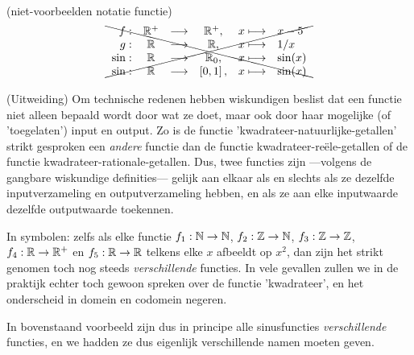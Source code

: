 \documentclass{ximera}
\begin{document}
\begin{example} (niet-voorbeelden notatie functie)
$$  
\xcancel{
	\begin{array}{rcccll}    
	f:   & \mathbb{R}^+        &\longrightarrow& \mathbb{R}^+,         &x  \longmapsto & x-5  \\
	g:   & \mathbb{R}      &\longrightarrow& \mathbb{R},         &x  \longmapsto & 1/x \\
	\sin:& \mathbb{R}        &\longrightarrow& \mathbb{R}_0,  &x \longmapsto & \sin(x) \\
	\sin:& \mathbb{R}        &\longrightarrow& \left[0,1\right],  &x \longmapsto & \sin(x) 
	\end{array}
}
	$$
\end{example}

\begin{uitweiding}
    
(Uitweiding) Om technische redenen hebben wiskundigen beslist dat een functie niet alleen bepaald wordt door wat ze doet, maar ook door haar mogelijke (of 'toegelaten') input en output. Zo is de functie 'kwadrateer-natuurlijke-getallen' strikt gesproken een \textit{andere} functie dan de functie kwadrateer-reële-getallen of de functie kwadrateer-rationale-getallen. Dus, twee functies zijn ---volgens de gangbare wiskundige definities--- gelijk aan elkaar als en slechts als ze dezelfde inputverzameling en outputverzameling hebben, en als ze aan elke inputwaarde dezelfde outputwaarde toekennen.

In symbolen: zelfs als elke functie
$f_1:\mathbb{N}\to\mathbb{N}$, $f_2:\mathbb{Z} \to\mathbb{N}$, $f_3:\mathbb{Z}\to\mathbb{Z}$, $f_4:\mathbb{R}\to\mathbb{R}^+$ en $f_5:\mathbb{R}\to\mathbb{R}$ telkens elke $x$ afbeeldt op $x^2$, dan zijn het strikt genomen toch nog steeds \textit{verschillende} functies. In vele gevallen zullen we in de praktijk echter toch gewoon spreken over de functie 'kwadrateer', en het onderscheid in domein en codomein negeren.

In bovenstaand voorbeeld zijn dus in principe alle sinusfuncties \textit{verschillende} functies, en we hadden ze dus eigenlijk verschillende namen moeten geven. 

\end{uitweiding}

\end{document}
